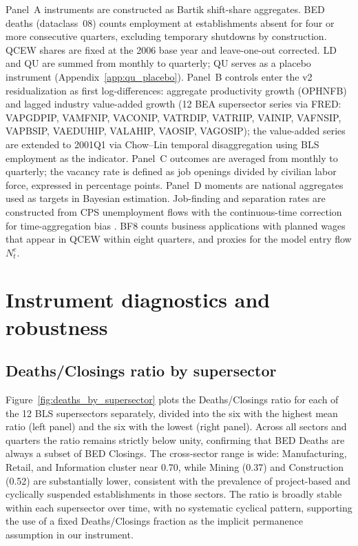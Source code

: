 \documentclass[authoryear, review, 12pt]{elsarticle}
\begin{document}
	\noindent Panel~A instruments are constructed as Bartik shift-share aggregates.
	BED deaths (dataclass~08) counts employment at establishments absent for four or more consecutive quarters, excluding temporary shutdowns by construction.
	QCEW shares are fixed at the 2006 base year and leave-one-out corrected.
	LD and QU are summed from monthly to quarterly; QU serves as a placebo instrument (Appendix~\ref{app:qu_placebo}).
	Panel~B controls enter the v2 residualization as first log-differences: aggregate productivity growth (OPHNFB) and lagged industry value-added growth (12 BEA supersector series via FRED: VAPGDPIP, VAMFNIP, VACONIP, VATRDIP, VATRIIP, VAINIP, VAFNSIP, VAPBSIP, VAEDUHIP, VALAHIP, VAOSIP, VAGOSIP); the value-added series are extended to 2001Q1 via Chow--Lin temporal disaggregation using BLS employment as the indicator.
	Panel~C outcomes are averaged from monthly to quarterly; the vacancy rate is defined as job openings divided by civilian labor force, expressed in percentage points.
	Panel~D moments are national aggregates used as targets in Bayesian estimation.
	Job-finding and separation rates are constructed from CPS unemployment flows with the continuous-time correction for time-aggregation bias \citep{shimer_2005}.
	BF8 counts business applications with planned wages that appear in QCEW within eight quarters, and proxies for the model entry flow $N^e_t$.


	\section{Instrument diagnostics and robustness}\label{app:diagnostics}
	\subsection{Deaths/Closings ratio by supersector}\label{app:deaths_closings_supersector}
	Figure~\ref{fig:deaths_by_supersector} plots the Deaths/Closings ratio
	for each of the 12 BLS supersectors separately, divided into the six
	with the highest mean ratio (left panel) and the six with the lowest
	(right panel).  Across all sectors and quarters the ratio remains
	strictly below unity, confirming that BED Deaths are always a subset
	of BED Closings.  The cross-sector range is wide: Manufacturing,
	Retail, and Information cluster near 0.70, while Mining (0.37) and
	Construction (0.52) are substantially lower, consistent with the
	prevalence of project-based and cyclically suspended establishments in
	those sectors.  The ratio is broadly stable within each supersector
	over time, with no systematic cyclical pattern, supporting the use of
	a fixed Deaths/Closings fraction as the implicit permanence assumption
	in our instrument.
	
\end{document}
